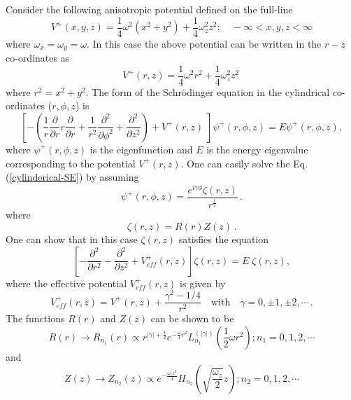 \documentclass[12pt]{article}
\numberwithin{equation}{section} %
\begin{document}
Consider the following anisotropic potential defined on the full-line
\begin{equation}
V^+(x,y,z)=\frac{1}{4}\omega^2 (x^2+y^2)+\frac{1}{4}\omega_z^2 z^2; \quad -\infty<x,y,z<\infty
\end{equation}
where $\omega_x=\omega_y=\omega$. In this case the above potential can be written in the $r-z$ co-ordinates as
\begin{equation}
  V^+(r,z)=\frac{1}{4}\omega^2 r^2+\frac{1}{4}\omega_z^2 z^2\,
\end{equation}
where $r^2=x^2+y^2$. 
The form of the Schr\"odinger equation in the cylindrical co-ordinates ($r,\phi,z$) is
\begin{equation}\label{cylinderical-SE}
  \left[-\left(\frac{1}{r}\frac{\partial }{\partial r}r\frac{\partial }{\partial r}+\frac{1}{r^2}\frac{\partial^2 }{\partial \phi^2}+\frac{\partial^2 }{\partial z^2}\right)+V^+(r,z)\;\right]\psi^+(r,\phi,z)=E\psi^+ (r,\phi,z),
\end{equation}
where $\psi^+ (r,\phi,z)$ is the eigenfunction and $E$ is the energy eigenvalue corresponding to the potential $V^+(r,z)$. One can easily solve the 
Eq. (\ref{cylinderical-SE}) by assuming 
\begin{equation}\label{rphiz}
\psi^+ (r,\phi,z)=\frac{e^{i\gamma \phi} \zeta(r,z)}{r^{\frac{1}{2}}}\,.
\end{equation}
where
\begin{equation}
\zeta(r,z) = R(r) Z(z)\,.
\end{equation}
One can show that in this case $\zeta(r,z)$ satisfies the equation
\begin{equation}
\left[-\frac{\partial^2}{\partial r^2}-\frac{\partial^2}{\partial z^2}
+V^+_{eff}(r,z)\right]\zeta(r,z)=E\;\zeta(r,z),
\end{equation}
where the effective potential $V^+_{eff}(r,z)$ is given by
\begin{equation}
V^+_{eff}(r,z)=V^+(r,z)+\frac{\gamma^2-1/4}{r^2}\quad\text{with}\quad  
\gamma=0,\pm1,\pm2,\cdots \,.
\end{equation} 
The functions $R(r)$ and $Z(z)$ can be shown to be
\begin{equation}
R(r)\rightarrow R_{n_1}(r)\propto r^{|\gamma|+\frac{1}{2}}e^{-\frac{\omega}{4}r^2}L_{n_1}^{(|\gamma|)}\left(\frac{1}{2}\omega r^2\right); n_1=0,1,2,\cdots
\end{equation}
and 
\begin{equation}
Z(z)\rightarrow Z_{n_2}(z)\propto e^{-\frac{\omega_z z^2}{4}}H_{n_2}\left(\sqrt{\frac{\omega_z}{2}} z\right); n_2=0,1,2,\cdots
\end{equation}
\end{document}
